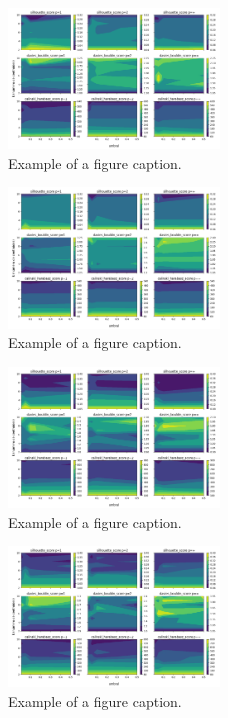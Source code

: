 \begin{figure}[htbp]
\centerline{\includegraphics[width=0.5\textwidth]{graficos_experimentos/k_medias/caracteristicos2_pca0.95.png}}
\caption{Example of a figure caption.}
\label{graficos_experimentos/k_medias/caracteristicos2_pca0.95.png}
\end{figure}
 
\begin{figure}[htbp]
\centerline{\includegraphics[width=0.5\textwidth]{graficos_experimentos/k_medias/caracteristicos2_pca0.99.png}}
\caption{Example of a figure caption.}
\label{graficos_experimentos/k_medias/caracteristicos2_pca0.99.png}
\end{figure}
 
\begin{figure}[htbp]
\centerline{\includegraphics[width=0.5\textwidth]{graficos_experimentos/k_medias/caracteristicos3_pca0.9.png}}
\caption{Example of a figure caption.}
\label{graficos_experimentos/k_medias/caracteristicos3_pca0.9.png}
\end{figure}
 
\begin{figure}[htbp]
\centerline{\includegraphics[width=0.5\textwidth]{graficos_experimentos/k_medias/caracteristicos3_pca0.95.png}}
\caption{Example of a figure caption.}
\label{graficos_experimentos/k_medias/caracteristicos3_pca0.95.png}
\end{figure}
 
